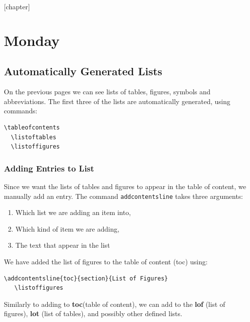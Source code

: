 \documentclass[a4paper,10pt]{report} %
\begin{document}
\newpage 

\setcounter{chapter}{2}
[chapter]
\chapter{Monday} 

\section{Automatically Generated Lists}\label{sec:automatic}
On the previous pages we can see lists of tables, figures, symbols and abbreviations. The first three of the lists are automatically generated, using commands:

\begin{lstlisting}[language={[latex]tex},
  frame=single,
  basicstyle=\footnotesize\color{darkgray}, 
  keywordstyle=\bf\color{magenta},
  commentstyle=\color{ForestGreen},  %
  breaklines=true
  ]
  \tableofcontents
  \listoftables
  \listoffigures
\end{lstlisting}

\subsection{Adding Entries to List}
 Since we want the lists of tables and figures to appear in the table of content, we manually add an entry. The command \texttt{addcontentsline} takes three arguments:
 \begin{enumerate}[label=\arabic*)]
  \item Which list we are adding an item into,
  \item Which kind of item we are adding,
  \item The text that appear in the list
 \end{enumerate}

 We have added the list of figures to the table of content (toc) using: 
 \begin{lstlisting}[language={[latex]tex},
   frame=single,
   basicstyle=\footnotesize\color{darkgray}, 
   keywordstyle=\bf\color{magenta},
   commentstyle=\color{ForestGreen},  %
   breaklines=true
   ]
   \addcontentsline{toc}{section}{List of Figures} 
   \listoffigures
\end{lstlisting}

Similarly to adding to \textbf{toc}(table of content), we can add to the 
\textbf{lof} (list of figures), \textbf{lot} (list of tables), and possibly other defined lists.   
\end{document}
